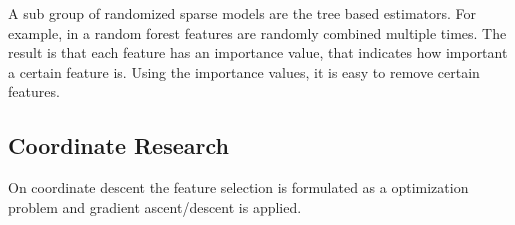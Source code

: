A sub group of randomized sparse models are the tree based estimators. For example, in a random forest features are randomly combined multiple times. The result is that each feature has an importance value, that indicates how important a certain feature is. Using the importance values, it is easy to remove certain features.

\subsection{Coordinate Research}
On coordinate descent the feature selection is formulated as a optimization problem and gradient ascent/descent is applied.